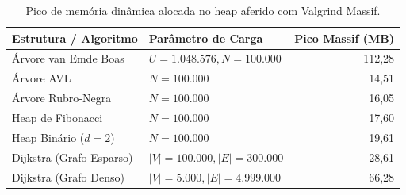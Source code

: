\begin{table}[htbp]
  \centering
  \caption{Pico de memória dinâmica alocada no heap aferido com Valgrind Massif.}
  \label{tab:valgrind-massif}
  \begin{tabular}{llr}
    \toprule
    \textbf{Estrutura / Algoritmo} & \textbf{Parâmetro de Carga} & \textbf{Pico Massif (MB)} \\
    \midrule
    Árvore van Emde Boas & $U = 1.048.576, N = 100.000$ & 112,28 \\
    Árvore AVL & $N = 100.000$ & 14,51 \\
    Árvore Rubro-Negra & $N = 100.000$ & 16,05 \\
    Heap de Fibonacci & $N = 100.000$ & 17,60 \\
    Heap Binário ($d=2$) & $N = 100.000$ & 19,61 \\
    Dijkstra (Grafo Esparso) & $|V|=100.000, |E|=300.000$ & 28,61 \\
    Dijkstra (Grafo Denso) & $|V|=5.000, |E|=4.999.000$ & 66,28 \\
    \bottomrule
  \end{tabular}
\end{table}
